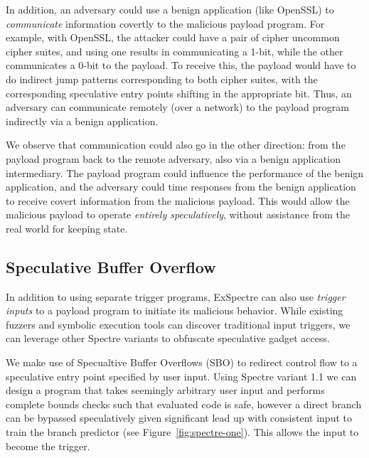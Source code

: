 \medskip

In addition, an adversary could use a benign application (like OpenSSL) to
\emph{communicate} information covertly to the malicious payload program. For
example, with OpenSSL, the attacker could have a pair of cipher uncommon cipher
suites, and using one results in communicating a 1-bit, while the other
communicates a 0-bit to the payload. To receive this, the payload would have to
do indirect jump patterns corresponding to both cipher suites, with the
corresponding speculative entry points shifting in the appropriate bit. Thus, an
adversary can communicate remotely (over a network) to the payload program
indirectly via a benign application.

We observe that communication could also go in the other direction: from
the payload program back to the remote adversary, also via a benign application
intermediary. The payload program could influence the performance of the benign
application, and the adversary could time responses from the benign application
to receive covert information from the malicious payload. This would allow the
malicious payload to operate \emph{entirely speculatively}, without assistance
from the real world for keeping state.





\subsection{Speculative Buffer Overflow}

\FigSpectreOne

In addition to using separate trigger programs, ExSpectre can also use
\emph{trigger inputs} to a payload program to initiate its malicious behavior.
While existing fuzzers and symbolic execution tools can discover traditional
input triggers, we can leverage other Spectre variants to obfuscate speculative
gadget access. 

We make use of Specualtive Buffer Overflows (SBO) to redirect control flow
to a speculative entry point specified by user input. Using Spectre variant 1.1 
we can design a program that takes seemingly arbitrary user input and performs complete 
bounds checks such that evaluated code is safe, however a direct branch can
be bypassed speculatively given significant lead up with consistent input 
to train the branch predictor (see Figure~\ref{fig:spectre-one}). This allows the input
to become the trigger. 

